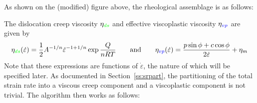 As shown on the (modified) figure above, the rheological assemblage is as follows:
\begin{center}

\end{center}
The dislocation creep viscosity $\eta_{\color{green}ds}$ and effective 
viscoplastic viscosity $\eta_{\color{blue}vp}$ are given by 
\[
\eta_{\color{green}ds}(\dot\varepsilon) 
= \frac{1}{2} A^{-1/n} \dot{\varepsilon}^{-1+1/n} \exp \frac{Q}{nRT}
\qquad
\text{and}
\qquad
\eta_{\color{blue}vp}(\dot\varepsilon) 
= \frac{p \sin \phi + c \cos \phi}{2 \dot{\varepsilon}}  + \eta_{m}
\]
Note that these expressions are functions of $\dot\varepsilon$, the nature of which will be specified later. 
As documented in Section~\ref{ss:srpart}, 
the partitioning of the total strain rate into a viscous creep component and a viscoplastic component 
is not trivial.  
The algorithm then works as follows:

